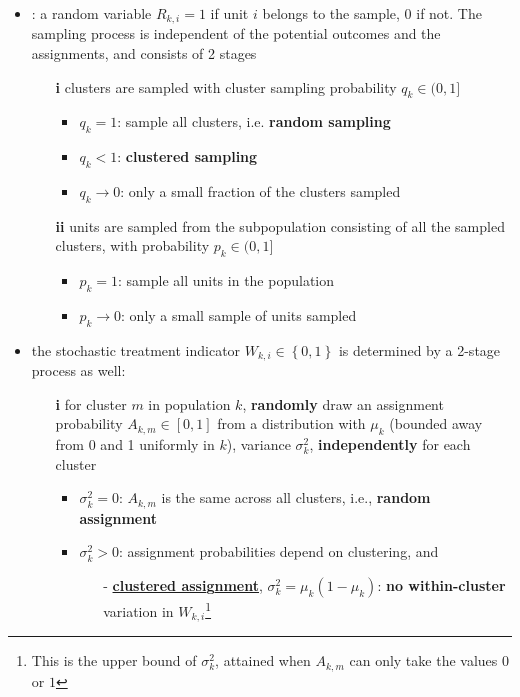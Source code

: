 \documentclass[twoside]{article}
\begin{document}
\begin{itemize}
    \item {}: a random variable $R_{k,i}=1$ if unit $i$ belongs to the sample, $0$ if not. The sampling process is independent of the potential outcomes and the assignments, and consists of 2 stages  
    \begin{itemize}
        \item[\textbf{i}] clusters are sampled with cluster sampling probability $q_k\in(0,1]$ 
        \begin{itemize}
            \item $q_k=1$: sample all clusters, i.e. \textbf{random sampling}
            \item $q_k<1$: \textbf{clustered sampling}
            \item $q_k\rightarrow 0$: only a small fraction of the clusters sampled
        \end{itemize}
        \item[\textbf{ii}] units are sampled from the subpopulation consisting of all the sampled clusters, with probability $p_k\in (0,1]$
        \begin{itemize}
            \item $p_k=1$: sample all units in the population
            \item $p_k\rightarrow 0$: only a small sample of units sampled
        \end{itemize}
    \end{itemize}
    \item {} the stochastic treatment indicator $W_{k,i}\in\left\{0,1\right\}$ is determined by a 2-stage process as well:
    \begin{itemize}
        \item[\textbf{i}] for cluster $m$ in population $k$, \textbf{randomly} draw an assignment probability $A_{k,m}\in\left[0,1\right]$ from a distribution with $\mu_k$ (bounded away from 0 and 1 uniformly in $k$), variance $\sigma^2_k$, \textbf{independently} for each cluster
        \begin{itemize}
            \item $\sigma^2_k=0$: $A_{k,m}$ is the same across all clusters, i.e., \textbf{random assignment}
            \item $\sigma^2_k>0$: assignment probabilities depend on clustering, and
            \begin{itemize}
                \item[-] \textbf{\underline{clustered assi}g\underline{nment}}, $\sigma^2_k=\mu_k(1-\mu_k)$: \textbf{no within-cluster} variation in $W_{k,i}$\footnote{This is the upper bound of $\sigma^2_k$, attained when $A_{k,m}$ can only take the values $0$ or $1$}

\end{itemize}
\end{itemize}
\end{itemize}
\end{itemize}
\end{document}
